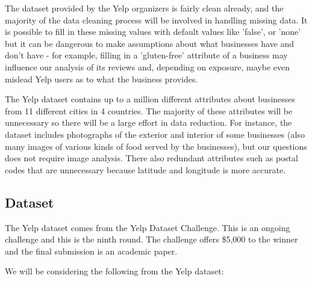 \quad The dataset provided by the Yelp organizers is fairly clean already, and the majority of the data cleaning process will be involved in handling missing data. It is possible to fill in these missing values with default values like 'false', or 'none' but it can be dangerous to make assumptions about what businesses have and don't have - for example, filling in a 'gluten-free' attribute of a business may influence our analysis of its reviews and, depending on exposure, maybe even mislead Yelp users as to what the business provides.

\quad The Yelp dataset contains up to a million different attributes about businesses from 11 different cities in 4 countries. The majority of these attributes will be unnecessary so there will be a large effort in data reduction. For instance, the dataset includes photographs of the exterior and interior of some businesses (also many images of various kinds of food served by the businesses), but our questions does not require image analysis. There also redundant attributes such as postal codes that are unnecessary because latitude and longitude is more accurate.

\subsection{Dataset}

\quad The Yelp dataset comes from the Yelp Dataset Challenge. This is an ongoing challenge and this is the ninth round. The challenge offers \$5,000 to the winner and the  final submission is an academic paper.

\quad We will be considering the following from the Yelp dataset:

